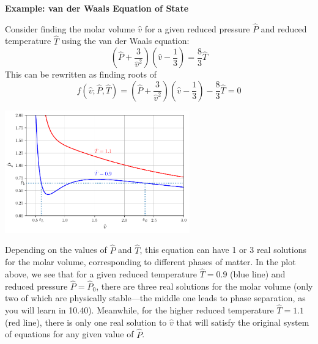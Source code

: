 \begin{exampleBox}
\textbf{Example: van der Waals Equation of State}

Consider finding the molar volume $\hat{v}$ for a given reduced pressure $\hat{P}$ and reduced temperature $\hat{T}$ using the van der Waals equation:
\begin{equation}
\left(\hat{P} + \frac{3}{\hat{v}^2}\right)\left(\hat{v} - \frac{1}{3}\right) = \frac{8}{3}\hat{T}
\end{equation}
This can be rewritten as finding roots of
\begin{equation}
f(\hat{v}; \hat{P}, \hat{T}) = \left(\hat{P} + \frac{3}{\hat{v}^2}\right)\left(\hat{v} - \frac{1}{3}\right) - \frac{8}{3}\hat{T} = 0
\end{equation}

\begin{center}
\includegraphics[width=0.6\textwidth]{figs/nle/vdw_eos.pdf}
\end{center}

Depending on the values of $\hat{P}$ and $\hat{T}$, this equation can have 1 or 3 real solutions for the molar volume, corresponding to different phases of matter. In the plot above, we see that for a given reduced temperature $\hat{T} = 0.9$ (blue line) and reduced pressure $\hat{P} = \hat{P}_0$, there are three real solutions for the molar volume (only two of which are physically stable---the middle one leads to phase separation, as you will learn in 10.40). Meanwhile, for the higher reduced temperature $\hat{T} = 1.1$ (red line), there is only one real solution to $\hat v$ that will satisfy the original system of equations for any given value of $\hat{P}$. %
\end{exampleBox}
    
